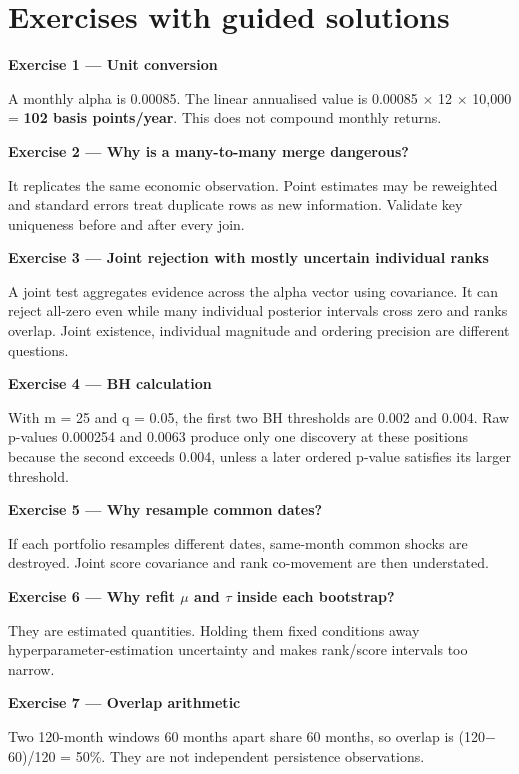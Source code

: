 \hypertarget{exercises}{}
\hypertarget{exercises-with-guided-solutions}{%
\chapter{Exercises with guided
solutions}\label{exercises-with-guided-solutions}}

\textbf{Exercise 1 --- Unit conversion}

A monthly alpha is 0.00085. The linear annualised value is 0.00085 \ensuremath{\times } 12
\ensuremath{\times } 10,000 = \textbf{102 basis points/year}. This does not compound
monthly returns.

\textbf{Exercise 2 --- Why is a many-to-many merge dangerous?}

It replicates the same economic observation. Point estimates may be
reweighted and standard errors treat duplicate rows as new information.
Validate key uniqueness before and after every join.

\textbf{Exercise 3 --- Joint rejection with mostly uncertain individual ranks}

A joint test aggregates evidence across the alpha vector using
covariance. It can reject all-zero even while many individual posterior
intervals cross zero and ranks overlap. Joint existence, individual
magnitude and ordering precision are different questions.

\textbf{Exercise 4 --- BH calculation}

With m = 25 and q = 0.05, the first two BH thresholds are 0.002 and
0.004. Raw p-values 0.000254 and 0.0063 produce only one discovery at
these positions because the second exceeds 0.004, unless a later ordered
p-value satisfies its larger threshold.

\textbf{Exercise 5 --- Why resample common dates?}

If each portfolio resamples different dates, same-month common shocks
are destroyed. Joint score covariance and rank co-movement are then
understated.

\textbf{Exercise 6 --- Why refit \ensuremath{\mu } and \ensuremath{\tau } inside each bootstrap?}

They are estimated quantities. Holding them fixed conditions away
hyperparameter-estimation uncertainty and makes rank/score intervals too
narrow.

\textbf{Exercise 7 --- Overlap arithmetic}

Two 120-month windows 60 months apart share 60 months, so overlap is
(120\ensuremath{-}60)/120 = 50\%. They are not independent persistence observations.

